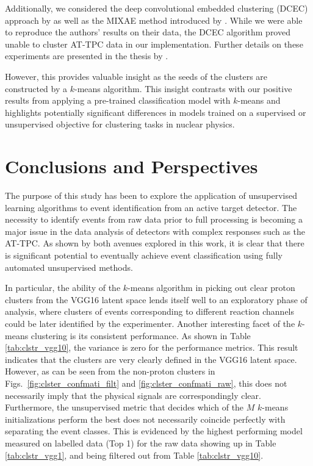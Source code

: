 \documentclass[preprint,12pt]{elsarticle}
\begin{document}
Additionally, we considered the deep convolutional embedded clustering (DCEC) approach by \citet{Guo2017} as well as the MIXAE method introduced by \citet{Zhang}. While we were able to reproduce the authors' results on their data, the DCEC algorithm proved unable to cluster AT-TPC data in our implementation. Further details on these experiments are presented in the thesis by \citet{SolliThesis}.

However, this provides valuable insight as the seeds of the clusters are constructed by a $k$-means algorithm. This insight contrasts with our positive results from applying a pre-trained classification model with $k$-means and highlights potentially significant differences in models trained on a supervised or unsupervised objective for clustering tasks in nuclear physics. 

\section{Conclusions and Perspectives}\label{sec:conclusion}
The purpose of this study has been to explore the application of unsupervised learning algorithms to event identification from an active target detector. The necessity to identify events from raw data prior to full processing is becoming a major issue in the data analysis of detectors with complex responses such as the AT-TPC.
As shown by both avenues explored in this work, it is clear that there is significant potential to eventually achieve event classification using fully automated unsupervised methods.

In particular, the ability of the $k$-means algorithm in picking out clear proton clusters from the VGG16 latent space lends itself well to an exploratory phase of analysis, where clusters of events corresponding to different reaction channels could be later identified by the experimenter.
Another interesting facet of the $k$-means clustering is its consistent performance. As shown in Table \ref{tab:clstr_vgg10}, the variance is zero for the performance metrics. This result indicates that the clusters are very clearly defined in the VGG16 latent space. However, as can be seen from the non-proton clusters in Figs.~\ref{fig:clster_confmati_filt} and \ref{fig:clster_confmati_raw},  this does not necessarily imply that the physical signals are correspondingly clear.  Furthermore, the unsupervised metric that decides which of the $M$ $k$-means initializations perform the best does not necessarily coincide perfectly with separating the event classes. This is evidenced by the highest performing model measured on labelled data (Top 1) for the raw data showing up in Table \ref{tab:clstr_vgg1}, and being filtered out from Table \ref{tab:clstr_vgg10}.
\end{document}
